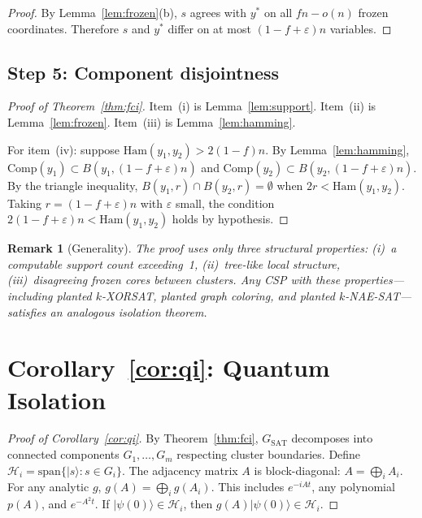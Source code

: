 \documentclass[11pt]{article}
\newtheorem{remark}[theorem]{Remark}
\begin{document}
\begin{proof}
By Lemma~\ref{lem:frozen}(b), $s$ agrees with $y^*$ on all $fn - o(n)$ frozen coordinates.  Therefore $s$ and $y^*$ differ on at most $(1 - f + \varepsilon)n$ variables.
\end{proof}


\subsection{Step 5: Component disjointness}

\begin{proof}[Proof of Theorem~\ref{thm:fci}]
Item~(i) is Lemma~\ref{lem:support}.  Item~(ii) is Lemma~\ref{lem:frozen}.  Item~(iii) is Lemma~\ref{lem:hamming}.

For item~(iv): suppose $\mathrm{Ham}(y_1, y_2) > 2(1-f)n$.  By Lemma~\ref{lem:hamming}, $\mathrm{Comp}(y_1) \subset B(y_1, (1-f+\varepsilon)n)$ and $\mathrm{Comp}(y_2) \subset B(y_2, (1-f+\varepsilon)n)$.  By the triangle inequality, $B(y_1, r) \cap B(y_2, r) = \emptyset$ when $2r < \mathrm{Ham}(y_1, y_2)$.  Taking $r = (1-f+\varepsilon)n$ with $\varepsilon$ small, the condition $2(1-f+\varepsilon)n < \mathrm{Ham}(y_1, y_2)$ holds by hypothesis.
\end{proof}

\begin{remark}[Generality]\label{rem:general}
The proof uses only three structural properties: (i)~a computable support count exceeding~1, (ii)~tree-like local structure, (iii)~disagreeing frozen cores between clusters.  Any CSP with these properties---including planted $k$-XORSAT, planted graph coloring, and planted $k$-NAE-SAT---satisfies an analogous isolation theorem.
\end{remark}


\section{Corollary~\ref{cor:qi}: Quantum Isolation}

\begin{proof}[Proof of Corollary~\ref{cor:qi}]
By Theorem~\ref{thm:fci}, $G_{\mathrm{SAT}}$ decomposes into connected components $G_1, \ldots, G_m$ respecting cluster boundaries.  Define $\mathcal{H}_i = \mathrm{span}\{|s\rangle : s \in G_i\}$.  The adjacency matrix $A$ is block-diagonal: $A = \bigoplus_i A_i$.  For any analytic $g$, $g(A) = \bigoplus_i g(A_i)$.  This includes $e^{-iAt}$, any polynomial $p(A)$, and $e^{-A^2 t}$.  If $|\psi(0)\rangle \in \mathcal{H}_i$, then $g(A)|\psi(0)\rangle \in \mathcal{H}_i$.
\end{proof}
\end{document}
